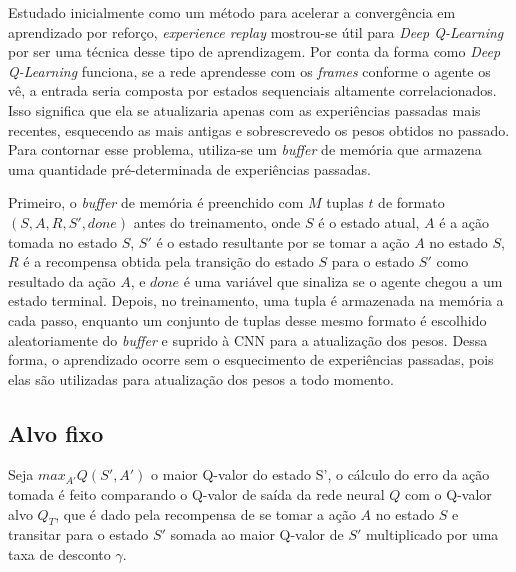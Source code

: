 Estudado inicialmente como um método para acelerar a convergência em aprendizado por reforço, \textit{experience replay} mostrou-se útil para \textit{Deep Q-Learning} por ser uma técnica desse tipo de aprendizagem.
Por conta da forma como \textit{Deep Q-Learning} funciona, se a rede aprendesse com os \textit{frames} conforme o agente os vê, a entrada seria composta por estados sequenciais altamente correlacionados.
Isso significa que ela se atualizaria apenas com as experiências passadas mais recentes, esquecendo as mais antigas e sobrescrevedo os pesos obtidos no passado.
Para contornar esse problema, utiliza-se um \textit{buffer} de memória que armazena uma quantidade pré-determinada de experiências passadas.

Primeiro, o \textit{buffer} de memória é preenchido com $M$ tuplas $t$ de formato $(S, A, R, S', done)$ antes do treinamento, onde $S$ é o estado atual, $A$ é a ação tomada no estado $S$, $S'$ é o estado resultante por se tomar a ação $A$ no estado $S$, $R$ é a recompensa obtida pela transição do estado $S$ para o estado $S'$ como resultado da ação $A$, e $done$ é uma variável que sinaliza se o agente chegou a um estado terminal.
Depois, no treinamento, uma tupla é armazenada na memória a cada passo, enquanto um conjunto de tuplas desse mesmo formato é escolhido aleatoriamente do \textit{buffer} e suprido à CNN para a atualização dos pesos.
Dessa forma, o aprendizado ocorre sem o esquecimento de experiências passadas, pois elas são utilizadas para atualização dos pesos a todo momento.


\subsection{Alvo fixo}
\label{sec:ft}

Seja $max_{A'}Q(S',A')$ o maior Q-valor do estado S', o cálculo do erro da ação tomada é feito comparando o Q-valor de saída da rede neural $Q$ com o Q-valor alvo $Q_{T}$, que é dado pela recompensa de se tomar a ação $A$ no estado $S$ e transitar para o estado $S'$ somada ao maior Q-valor de $S'$ multiplicado por uma taxa de desconto $\gamma$.

